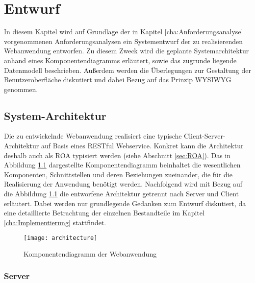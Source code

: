\chapter{Entwurf}
\label{cha:Entwurf}

In diesem Kapitel wird auf Grundlage der in Kapitel \ref{cha:Anforderungsanalyse} vorgenommenen Anforderungsanalysen ein Systementwurf der zu realisierenden Webanwendung entworfen. Zu diesem Zweck wird die geplante Systemarchitektur anhand eines Komponentendiagramms erläutert, sowie das zugrunde liegende Datenmodell beschrieben. Außerdem werden die Überlegungen zur Gestaltung der Benutzeroberfläche diskutiert und dabei Bezug auf das Prinzip WYSIWYG genommen.

\section{System-Architektur}

Die zu entwickelnde Webanwendung realisiert eine typische Client-Server-Architektur auf Basis eines RESTful Webservice. Konkret kann die Architektur deshalb auch als \acf{ROA} typisiert werden (siehe Abschnitt \ref{sec:ROA}). Das in Abbildung \ref{fig:architecture} dargestellte Komponentendiagramm beinhaltet die wesentlichen Komponenten, Schnittstellen und deren Beziehungen zueinander, die für die Realisierung der Anwendung benötigt werden. Nachfolgend wird mit Bezug auf die Abbildung \ref{fig:architecture} die entworfene Architektur getrennt nach Server und Client erläutert. Dabei werden nur grundlegende Gedanken zum Entwurf diskutiert, da eine detaillierte Betrachtung der einzelnen Bestandteile im Kapitel \ref{cha:Implementierung} stattfindet.

\begin{figure}[H]
\centering
\texttt{[image: architecture]} %
\caption{Komponentendiagramm der Webanwendung}
\label{fig:architecture}
\end{figure}

\subsection{Server}
\label{sec:Entwurf:Server}

